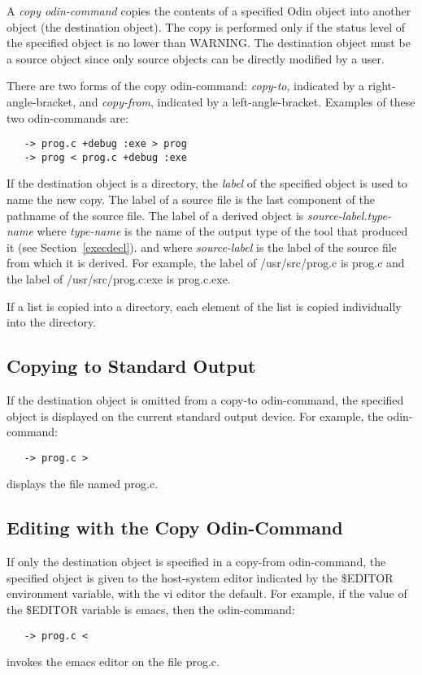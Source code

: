 A {\em copy odin-command} copies the contents of a specified Odin object
into another object (the destination object).
The copy is performed only if the status level
of the specified object is no lower than {\ex WARNING}.
The destination object must be a source object
since only source objects can be directly modified by a user.

There are two forms of the copy odin-command:
{\em copy-to}, indicated by a right-angle-bracket, and
{\em copy-from}, indicated by a left-angle-bracket.
Examples of these two odin-commands are:
\begin{verbatim}
   -> prog.c +debug :exe > prog
   -> prog < prog.c +debug :exe
\end{verbatim}

If the destination object is a directory,
the {\em label} of the specified object is used to name the new copy.
The label of a source file is
the last component of the pathname of the source file.
The label of a derived object is {\em source-label.type-name}
where {\em type-name} is the name of the output type
of the tool that produced it (see Section~\ref{execdecl}).
and where {\em source-label} is the label of the source file
from which it is derived.
For example, the label of {\ex /usr/src/prog.c} is {\ex prog.c} and
the label of {\ex /usr/src/prog.c:exe} is {\ex prog.c.exe}.

If a list is copied into a directory,
each element of the list is copied individually into the directory.

\subsection{Copying to Standard Output}

If the destination object is omitted from a copy-to odin-command,
the specified object is displayed on the current standard output device.
For example, the odin-command:
\begin{verbatim}
   -> prog.c >
\end{verbatim}
displays the file named {\ex prog.c}.

\subsection{Editing with the Copy Odin-Command}

If only the destination object is specified in a copy-from odin-command,
the specified object is given to the host-system editor
indicated by the {\ex \$EDITOR} environment variable,
with the {\ex vi} editor the default.
For example, if the value of the {\ex \$EDITOR} variable is {\ex emacs},
then the odin-command:
\begin{verbatim}
   -> prog.c <
\end{verbatim}
invokes the {\ex emacs} editor on the file {\ex prog.c}.


